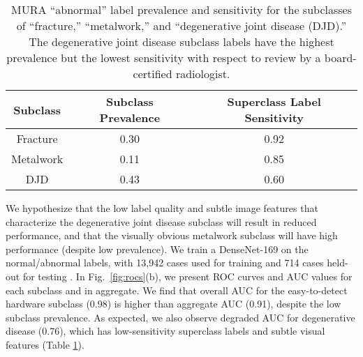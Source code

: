 \documentclass[sigconf]{acmart}
\begin{document}
\begin{table}[]
\centering
\begin{tabular}{ccc}
 \toprule
 Subclass & Subclass Prevalence & Superclass Label Sensitivity \\
 \toprule
 Fracture & 0.30 & 0.92   \\
 Metalwork & 0.11 & 0.85    \\
 DJD & 0.43 & 0.60 \\
 \toprule
\end{tabular}
\caption{MURA ``abnormal'' label prevalence and sensitivity for the subclasses of ``fracture,'' ``metalwork,'' and ``degenerative joint disease (DJD).'' The degenerative joint disease subclass labels have the highest prevalence but the lowest sensitivity with respect to review by a board-certified radiologist.}
\label{tab:mura2}
\end{table}

We hypothesize that the low label quality and subtle image features that characterize the degenerative joint disease subclass will result in reduced performance, and that the visually obvious metalwork subclass will have high performance (despite low prevalence).
 We train a DenseNet-169 on the normal/abnormal labels, with 13,942 cases used for training and 714 cases held-out for testing \citep{Rajpurkar2017-rc}.  
 In Fig.~\ref{fig:rocs}(b), we present ROC curves and AUC values for each subclass and in aggregate.  
 We find that overall AUC for the easy-to-detect hardware subclass (0.98) is higher than aggregate AUC (0.91), despite the low subclass prevalence.
 As expected, we also observe degraded AUC for degenerative disease (0.76), which has low-sensitivity superclass labels and subtle visual features (Table \ref{tab:mura2}).  
\end{document}
